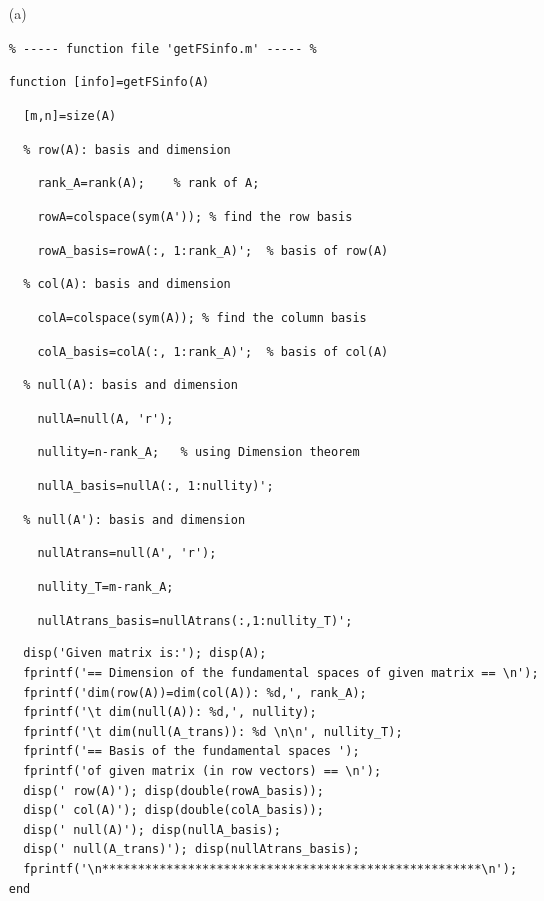 \begin{sol}
\verb""
\begin{enumerate}
\item[(a)]

\verb"% ----- function file 'getFSinfo.m' ----- %"

\verb"function [info]=getFSinfo(A)"

\verb"  [m,n]=size(A)"

\verb"  % row(A): basis and dimension"

{\color{blue}\verb"    rank_A=rank(A);    % rank of A;"

    \verb"    rowA=colspace(sym(A')); % find the row basis"

    \verb"    rowA_basis=rowA(:, 1:rank_A)';  % basis of row(A)"
    }



\verb"  % col(A): basis and dimension"

{\color{blue}\verb"    colA=colspace(sym(A)); % find the column basis"

\verb"    colA_basis=colA(:, 1:rank_A)';  % basis of col(A)"
    }




\verb"  % null(A): basis and dimension"

{\color{blue}\verb"    nullA=null(A, 'r');"

\verb"    nullity=n-rank_A;   % using Dimension theorem"

\verb"    nullA_basis=nullA(:, 1:nullity)';"
    }

\verb"  % null(A'): basis and dimension"

{\color{blue}\verb"    nullAtrans=null(A', 'r');"

    \verb"    nullity_T=m-rank_A;    "

    \verb"    nullAtrans_basis=nullAtrans(:,1:nullity_T)';"
    }
\begin{verbatim}
  disp('Given matrix is:'); disp(A);
  fprintf('== Dimension of the fundamental spaces of given matrix == \n');
  fprintf('dim(row(A))=dim(col(A)): %d,', rank_A);
  fprintf('\t dim(null(A)): %d,', nullity);
  fprintf('\t dim(null(A_trans)): %d \n\n', nullity_T);
  fprintf('== Basis of the fundamental spaces ');
  fprintf('of given matrix (in row vectors) == \n');
  disp(' row(A)'); disp(double(rowA_basis));
  disp(' col(A)'); disp(double(colA_basis));
  disp(' null(A)'); disp(nullA_basis);
  disp(' null(A_trans)'); disp(nullAtrans_basis);
  fprintf('\n*****************************************************\n');
end
\end{verbatim}


\end{enumerate}
\end{sol}
